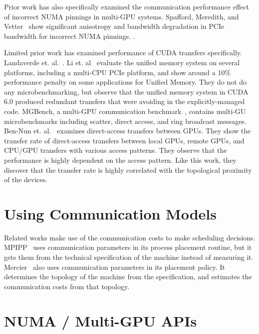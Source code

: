 Prior work has also specifically examined the communication performance effect of incorrect NUMA pinnings in multi-GPU systems.
Spafford, Meredith, and Vetter~\cite{spafford2011quantifying} show significant anisotropy and bandwidth degradation in PCIe bandwidth for incorrect NUMA pinnings. .

Limited prior work has examined performance of CUDA transfers specifically.
Landaverde et. al.~\cite{landaverde2014investigation}.
Li et. al~\cite{li2015evaluation} evaluate the unified memory system on several platforms, including a multi-CPU PCIe platform, and show around a 10\% performance penalty on some applications for Unified Memory.
They do not do any microbenchmarking, but observe that the unified memory system in CUDA 6.0 produced redundant transfers that were avoiding in the explicitly-managed code.
MGBench, a multi-GPU communication benchmark~\cite{bennun2016mgbench}, contains multi-GU microbenchmarks including scatter, direct access, and ring broadcast messages.
Ben-Nun et. al.~\cite{ben2017groute} examines direct-access transfers between GPUs.
They show the transfer rate of direct-access transfers between local GPUs, remote GPUs, and CPU/GPU transfers with various access patterns.
They observe that the performance is highly dependent on the access pattern.
Like this work, they discover that the transfer rate is highly correlated with the topological proximity of the devices.


\section{Using Communication Models}

Related works make use of the communication costs to make scheduling decisions.
MPIPP~\cite{chen2006mpipp} uses communication parameters in its process placement routine, but it gets them from the technical specification of the machine instead of measuring it.
Mercier~\cite{mercier2009towards} also uses communication parameters in its placement policy.
It determines the topology of the machine from the specification, and estimates the communication costs from that topology.

\section{NUMA / Multi-GPU APIs}

